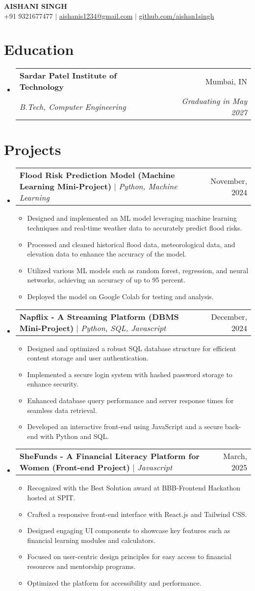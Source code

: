 \documentclass[letterpaper,11pt]{article}
\makeatletter
\newcommand{\resumeItem}[1]{\item\small{#1 \vspace{-2pt}}}
\newcommand{\resumeSubheading}[4]{
  \vspace{-2pt}\item
    \begin{tabular*}{0.97\textwidth}[t]{l@{\extracolsep{\fill}}r}
      \textbf{#1} & #2 \\
      \textit{\small#3} & \textit{\small#4} \\
    \end{tabular*}\vspace{-7pt}
}
\newcommand{\resumeProjectHeading}[2]{
  \item
    \begin{tabular*}{0.97\textwidth}{l@{\extracolsep{\fill}}r}
      \small#1 & #2 \\
    \end{tabular*}\vspace{-7pt}
}
\newcommand{\resumeItemListStart}{\begin{itemize}}
\newcommand{\resumeItemListEnd}{\end{itemize}\vspace{-5pt}}
\newcommand{\resumeSubHeadingListStart}{\begin{itemize}[leftmargin=0.15in, label={}]}
\newcommand{\resumeSubHeadingListEnd}{\end{itemize}}
\makeatother
\begin{document}
\begin{center}
  \textbf{\Huge \scshape AISHANI SINGH} \\ \vspace{1pt}
  \small +91 9321677477 $|$ \href{mailto:aishanis1234@gmail.com}{aishanis1234@gmail.com} $|$
  \href{https://github.com/aishan1singh}{github.com/aishan1singh}
\end{center}

\section{Education}
\resumeSubHeadingListStart
  \resumeSubheading
    {Sardar Patel Institute of Technology}{Mumbai, IN}
    {B.Tech, Computer Engineering}{Graduating in May 2027}
\resumeSubHeadingListEnd

\section{Projects}
\resumeSubHeadingListStart
  \resumeProjectHeading
    {\textbf{Flood Risk Prediction Model (Machine Learning Mini-Project)} $|$ \emph{Python, Machine Learning}}{November, 2024}
  \resumeItemListStart
    \resumeItem{Designed and implemented an ML model leveraging machine learning techniques and real-time weather data to accurately predict flood risks.}
    \resumeItem{Processed and cleaned historical flood data, meteorological data, and elevation data to enhance the accuracy of the model.}
    \resumeItem{Utilized various ML models such as random forest, regression, and neural networks, achieving an accuracy of up to 95 percent.}
    \resumeItem{Deployed the model on Google Colab for testing and analysis.}
  \resumeItemListEnd

  \resumeProjectHeading
    {\textbf{Napflix -  A Streaming Platform (DBMS Mini-Project)} $|$ \emph{Python, SQL, Javascript}}{December, 2024}
  \resumeItemListStart
    \resumeItem{Designed and optimized a robust SQL database structure for efficient content storage and user authentication.}
    \resumeItem{Implemented a secure login system with hashed password storage to enhance security.}
    \resumeItem{Enhanced database query performance and server response times for seamless data retrieval.}
    \resumeItem{Developed an interactive front-end using JavaScript and a secure back-end with Python and SQL.}
  \resumeItemListEnd

  \resumeProjectHeading
    {\textbf{SheFunds -  A Financial Literacy Platform for Women (Front-end Project)} $|$ \emph{Javascript}}{March, 2025}
  \resumeItemListStart
    \resumeItem{Recognized with the Best Solution award at BBB-Frontend Hackathon hosted at SPIT.}
    \resumeItem{Crafted a responsive front-end interface with React.js and Tailwind CSS.}
    \resumeItem{Designed engaging UI components to showcase key features such as financial learning modules and calculators.}
    \resumeItem{Focused on user-centric design principles for easy access to financial resources and mentorship programs.}
    \resumeItem{Optimized the platform for accessibility and performance.}
  \resumeItemListEnd
\resumeSubHeadingListEnd
\end{document}
